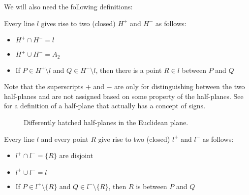 \begin{definition}\label{def:euclidean_plane_auxiliary_definitions}
  We will also need the following definitions:
  \begin{thmenum}
     Every line \( l \) gives rise to two (closed)  \( H^+ \) and \( H^- \) as follows:
    \begin{itemize}
      \item \( H^+ \cap H^- = l \)
      \item \( H^+ \cup H^- = A_2 \)
      \item If \( P \in H^+ \setminus l \) and \( Q \in H^- \setminus l \), then there is a point \( R \in l \) between \( P \) and \( Q \)
    \end{itemize}

    Note that the superscripts \( + \) and \( - \) are only for distinguishing between the two half-planes and are not assigned based on some property of the half-planes. See  for a definition of a half-plane that actually has a concept of signs.

    \begin{figure}
      \centering
      \iffalse\begin{mplibcode}
        input metapost/plotting;

        u := 1cm;

        beginfig(1);
        input hatching;

        path l, Hp, Hm;
        l = (0, -1) * u -- (3, 0) * u;
        draw l;

        Hp = l -- (3, 0.5) * u -- (0, 0.5) * u -- cycle;
        hatchfill Hp withcolor (45, 1mm, -.5bp);
        label.ulft("$H^+$", startpoint of l);

        Hm = l -- (3, -1.5) * u -- (0, -1.5) * u -- cycle;
        hatchfill Hm withcolor (135, 1mm, -.5bp);
        label.lrt("$H^-$", endpoint of l);
        endfig;
      \end{mplibcode}\fi

      \caption{Differently hatched half-planes in the Euclidean plane.}\label{def:affine_plane/bound_vector/half_plane}
    \end{figure}

     Every line \( l \) and every point \( R \) give rise to two (closed)  \( l^+ \) and \( l^- \) as follows:
    \begin{itemize}
      \item \( l^+ \cap l^- = \{ R \} \) are disjoint
      \item \( l^+ \cup l^- = l \)
      \item If \( P \in l^+ \setminus \{ R \} \) and \( Q \in l^- \setminus \{ R \} \), then \( R \) is between \( P \) and \( Q \)
    \end{itemize}


\end{thmenum}
\end{definition}
